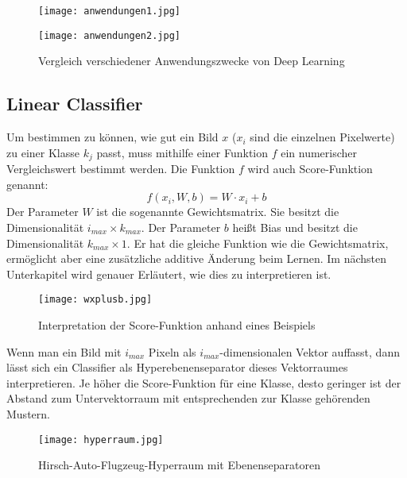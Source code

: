 \documentclass[11pt,ceqn]{book}
\begin{document}
\begin{figure}[H]
\centering
\texttt{[image: anwendungen1.jpg]}
\end{figure}



\begin{figure}[H]
\centering
\texttt{[image: anwendungen2.jpg]}
\caption{Vergleich verschiedener Anwendungszwecke von Deep Learning}
\end{figure}



\subsection{Linear Classifier}
Um bestimmen zu können, wie gut ein Bild $x$ ($x_i$ sind die einzelnen Pixelwerte) zu einer Klasse $k_j$ passt, muss mithilfe einer Funktion $f$ ein numerischer Vergleichswert bestimmt werden. Die Funktion $f$ wird auch Score-Funktion genannt:
$$f(x_i, W, b) = W \cdot x_i + b$$
Der Parameter $W$ ist die sogenannte Gewichtsmatrix. Sie besitzt die Dimensionalität $i_{max} \times k_{max}$.
Der Parameter $b$ heißt Bias und besitzt die Dimensionalität $k_{max} \times 1$. Er hat die gleiche Funktion wie die Gewichtsmatrix, ermöglicht aber eine zusätzliche additive Änderung beim Lernen. Im nächsten Unterkapitel wird genauer Erläutert, wie dies zu interpretieren ist.

\begin{figure}[H]
\centering
\texttt{[image: wxplusb.jpg]}
\caption{Interpretation der Score-Funktion anhand eines Beispiels}
\end{figure}

Wenn man ein Bild mit $i_{max}$ Pixeln als $i_{max}$-dimensionalen Vektor auffasst, dann lässt sich ein Classifier als Hyperebenenseparator dieses Vektorraumes interpretieren. Je höher die Score-Funktion für eine Klasse, desto geringer ist der Abstand zum Untervektorraum mit entsprechenden zur Klasse gehörenden Mustern.

\begin{figure}[H]
\centering
\texttt{[image: hyperraum.jpg]}
\caption{Hirsch-Auto-Flugzeug-Hyperraum mit Ebenenseparatoren}
\end{figure}
\end{document}
